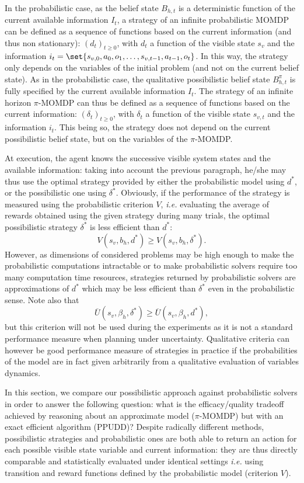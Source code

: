 In the probabilistic case, as the belief state $B_{h,t}$ is a deterministic function of the current available information $I_t$,
a strategy of an infinite probabilistic MOMDP can be defined as a sequence of functions based on the current information (and thus non stationary):
$(d_t)_{t\geqslant0}$, with $d_t$ a function of the visible state $s_v$ and the information $i_t = \set{ s_{v,0},a_0,o_1, \ldots,s_{v,t-1}, a_{t-1}, o_t }$.
In this way, the strategy only depends on the variables 
of the initial problem (and not on the current belief state).
As in the probabilistic case, the qualitative possibilistic belief state 
$B^{\pi}_{h,t}$ is fully specified by the current available information $I_t$.
The strategy of an infinite horizon $\pi$-MOMDP can thus be defined 
as a sequence of functions based on the current information:
$(\delta_t)_{t\geqslant0}$, with $\delta_t$ 
a function of the visible state $s_{v,t}$ and the information $i_t$.
This being so, the strategy does not depend on the current possibilistic belief state,
but on the variables of the $\pi$-MOMDP.

At execution, the agent knows the successive visible system states and the available information:
taking into account the previous paragraph,
he/she may thus use the optimal strategy provided by either the probabilistic model using $d^*$, or the possibilistic one using $\delta^*$.
Obviously, if the performance of the strategy is measured using the probabilistic criterion $V$,
\textit{i.e.} evaluating the average of rewards obtained using the given strategy during many trials, 
the optimal possibilistic strategy $\delta^*$ is less efficient than $d^*$: 
\[ V(s_v,b_h,d^*) \geqslant V(s_v,b_h,\delta^*). \]
However, as dimensions of considered problems may be high enough to make the probabilistic computations intractable
or to make probabilistic solvers require too many computation time resources,
strategies returned by probabilistic solvers are approximations of $d^*$ which may be less efficient than $\delta^*$
even in the probabilistic sense.
Note also that
\[ \overline{U}(s_v,\beta_h,\delta^*) \geqslant \overline{U}(s_v,\beta_h,d^*), \]
but this criterion will not be used during the experiments 
as it is not a standard performance measure when planning under uncertainty.
Qualitative criteria can however be good performance measure of strategies in practice 
if the probabilities of the model are in fact given arbitrarily 
from a qualitative evaluation of variables dynamics.

In this section, we compare our possibilistic approach against probabilistic solvers in order
to answer the following question: what is the efficacy/quality tradeoff achieved
by reasoning about an approximate model ($\pi$-MOMDP) but with an exact efficient algorithm (PPUDD)?
Despite radically different methods, possibilistic strategies and probabilistic ones 
are both able to return an action for each possible visible state variable and current information: 
they are thus directly comparable and statistically
evaluated under identical settings 
\textit{i.e.} using transition and reward functions defined by 
the probabilistic model (criterion $V$). 

